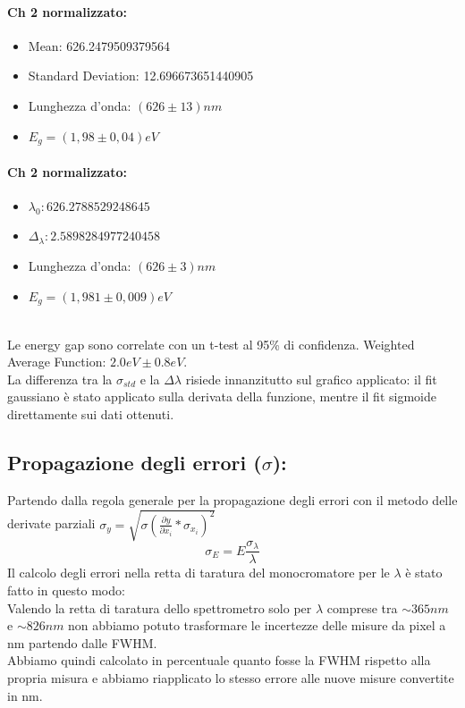 \documentclass{article}
\begin{document}
\begin{center}
    \begin{minipage}{0.4\textwidth}
        \paragraph{Ch 2 normalizzato:}
        \begin{itemize}
            \item Mean: 626.2479509379564
            \item Standard Deviation: 12.696673651440905
            \item Lunghezza d'onda:  $(626 \pm13)nm$
            \item $E_g=(1,98\pm 0,04 )eV$
        \end{itemize}        
    \end{minipage}
    \hfill
    \begin{minipage}{0.4\textwidth}
        \paragraph{Ch 2 normalizzato:}
        \begin{itemize}
            \item $\lambda_0: 626.2788529248645$
            \item $\Delta_\lambda: 2.5898284977240458$
            \item Lunghezza d'onda:  $(626 \pm3)nm$
            \item $E_g=(1,981\pm0,009  )eV$
        \end{itemize}
    \end{minipage}
\end{center}
\hrulefill
\\
Le energy gap sono correlate con un t-test al 95\% di confidenza. Weighted Average Function: $2.0 eV \pm 0.8 eV$.
\\
La differenza tra la $\sigma_{std}$ e la $\Delta\lambda$ risiede innanzitutto sul grafico applicato: il fit gaussiano è stato applicato sulla derivata della funzione, mentre il fit sigmoide direttamente sui dati ottenuti.

\subsection{Propagazione degli errori ($\sigma$): }
Partendo dalla regola generale per la propagazione degli errori con il metodo delle derivate parziali $\sigma_y=\sqrt{\sigma( \frac{\partial y}{\partial x_i}*\sigma_{x_i} )^2 }$
$$\sigma_E=E\frac{\sigma_{\lambda}}{\lambda}$$
Il calcolo degli errori nella retta di taratura del monocromatore per le $\lambda$ è stato fatto in questo modo:\\
Valendo la retta di taratura dello spettrometro solo per $\lambda$ comprese tra $\sim 365nm$ e $\sim 826nm$ non abbiamo potuto trasformare le incertezze delle misure da pixel a nm partendo dalle FWHM.\\
Abbiamo quindi calcolato in percentuale quanto fosse la FWHM rispetto alla propria misura e abbiamo riapplicato lo stesso errore alle nuove misure convertite in nm.
\end{document}

